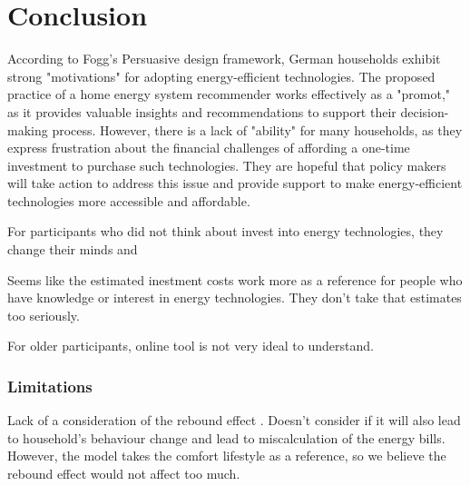 \chapter{Conclusion}

According to Fogg's Persuasive design framework, 
German households exhibit strong "motivations" for adopting energy-efficient technologies. 
The proposed practice of a home energy system recommender works effectively as a "promot," as it provides valuable insights and recommendations to support their decision-making process. 
However, there is a lack of "ability" for many households, 
as they express frustration about the financial challenges of affording a one-time investment to purchase such technologies. 
They are hopeful that policy makers will take action to address this issue and provide support to make energy-efficient technologies more accessible and affordable.

For participants who did not think about invest into energy technologies,
they change their minds and 

Seems like the estimated inestment costs work more as a reference for people who have knowledge or interest in energy technologies. 
They don't take that estimates too seriously. 

For older participants, online tool is not very ideal to understand. 

\subsection{Limitations}

Lack of a consideration of the rebound effect \cite{Herring2007}. 
Doesn't consider if it will also lead to household's behaviour change and lead to miscalculation of the energy bills. 
However, the model takes the comfort lifestyle as a reference, so we believe the rebound effect would not affect too much. 
